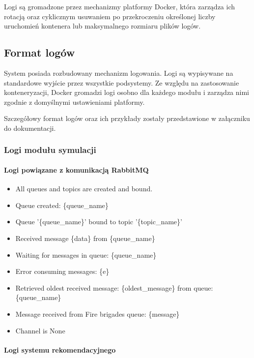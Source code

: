\documentclass[11pt,a4paper]{article}
\begin{document}
Logi są gromadzone przez mechanizmy platformy Docker, która zarządza ich rotacją oraz cyklicznym usuwaniem po przekroczeniu określonej liczby uruchomień kontenera lub maksymalnego rozmiaru plików logów.

\subsection{Format logów}

System posiada rozbudowany mechanizm logowania. Logi są wypisywane na standardowe wyjście przez wszystkie podsystemy. Ze względu na zastosowanie konteneryzacji, Docker gromadzi logi osobno dla każdego modułu i zarządza nimi zgodnie z domyślnymi ustawieniami platformy.

Szczegółowy format logów oraz ich przykłady zostały przedstawione w załączniku do dokumentacji.

\subsubsection{Logi modułu symulacji}

\paragraph{Logi powiązane z komunikacją RabbitMQ}

\begin{itemize}
    \item All queues and topics are created and bound.
    \item Queue created: \{queue\_name\}
    \item Queue '\{queue\_name\}' bound to topic '\{topic\_name\}'
    \item Received message \{data\} from \{queue\_name\}
    \item Waiting for messages in queue: \{queue\_name\}
    \item Error consuming messages: \{e\}
    \item Retrieved oldest received message: \{oldest\_message\} from queue: \{queue\_name\}
    \item Message received from Fire brigades queue: \{message\}
    \item Channel is None
\end{itemize}

\paragraph{Logi systemu rekomendacyjnego}
\end{document}
